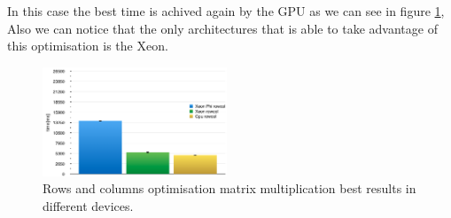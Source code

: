 \par{In this case the best time is achived again by the GPU as we can see in 
    figure \ref{RowsColRes}, Also we can notice that the only 
    architectures that is able to take advantage of this optimisation is the 
    Xeon.}

\begin{figure}[!h]
    \centering
    \includegraphics[width=0.49\textwidth]{figures/rowColRes.png}
    \caption{Rows and columns optimisation matrix multiplication best results 
            in different devices.}
    \label{RowsColRes}
\end{figure}

